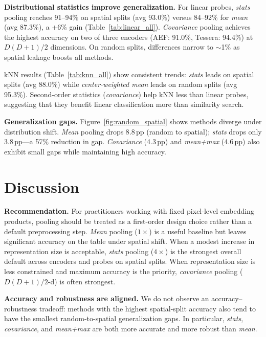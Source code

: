 \documentclass{article} %
\begin{document}
\textbf{Distributional statistics improve generalization.}
For linear probes, \textit{stats} pooling reaches 91--94\% on spatial splits
(avg 93.0\%) versus 84--92\% for \textit{mean} (avg 87.3\%), a +6\% gain
(Table~\ref{tab:linear_all}).
\textit{Covariance} pooling achieves the highest accuracy on two of three
encoders (AEF: 91.0\%, Tessera: 94.4\%) at $D(D{+}1)/2$ dimensions.
On random splits, differences narrow to ${\sim}$1\% as spatial leakage
boosts all methods.

kNN results (Table~\ref{tab:knn_all}) show consistent trends:
\textit{stats} leads on spatial splits (avg 88.0\%) while
\textit{center-weighted mean} leads on random splits (avg 95.3\%).
Second-order statistics (\textit{covariance}) help kNN less
than linear probes, suggesting that they benefit linear classification more
than similarity search.

\textbf{Generalization gaps.}
Figure~\ref{fig:random_spatial} shows methods diverge under distribution shift.
\textit{Mean} pooling drops 8.8\,pp (random to spatial); \textit{stats} drops
only 3.8\,pp---a 57\% reduction in gap.
\textit{Covariance} (4.3\,pp) and \textit{mean+max} (4.6\,pp)
also exhibit small gaps while maintaining high accuracy.



\section{Discussion}

\textbf{Recommendation.}
For practitioners working with fixed pixel-level embedding products, pooling
should be treated as a first-order design choice rather than a default
preprocessing step.
\textit{Mean} pooling ($1\times$) is a useful baseline but leaves significant
accuracy on the table under spatial shift.
When a modest increase in representation size is acceptable, \textit{stats}
pooling ($4\times$) is the strongest overall default across encoders and probes
on spatial splits.
When representation size is less constrained and maximum accuracy is the
priority, \textit{covariance} pooling ($D(D{+}1)/2$-d) is often strongest.

\textbf{Accuracy and robustness are aligned.}
We do not observe an accuracy--robustness tradeoff: methods with the highest
spatial-split accuracy also tend to have the smallest random-to-spatial
generalization gaps. In particular, \textit{stats}, \textit{covariance}, and
\textit{mean+max} are both more accurate and more robust than \textit{mean}.
\end{document}
